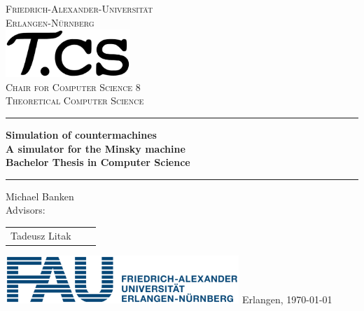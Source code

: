 \begin{titlepage}
\newcommand{\drop}{0.07\textheight}
\begin{center}
\begingroup%
\vfill
{\LARGE\textsc{%
Friedrich-Alexander-Universität\\[2mm]
Erlangen-Nürnberg%
}}\\[\drop]
{%
\includegraphics[height=1.8cm,trim=0cm 0mm 0 0mm]{img/tcs}\\
\textsc{\large Chair for Computer Science 8}\\
\textsc{\large Theoretical Computer Science}}%
\vfill
\rule{\textwidth}{1pt}\par
\vspace{0.5\baselineskip}
{%
\Huge\bfseries Simulation of countermachines
\\[1cm]
\large\bfseries
A simulator for the Minsky machine
\\[1cm]
\textbf{\large Bachelor Thesis in Computer Science}
}\\[0.5\baselineskip]
\rule{\textwidth}{1pt}\par
\vfill
{\Large{Michael Banken}\\
}
\vfill
\large Advisors:
\vfill
\begin{tabular}{ccc}
    \large
    Tadeusz Litak
\end{tabular}
\vfill
\includegraphics[height=1.8cm,trim=0cm -5mm 0 0mm]{img/fau}
\vfill
{\large Erlangen, \today}
\endgroup
\end{center}
\end{titlepage}

